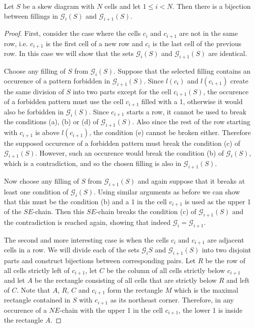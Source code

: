 \begin{lemma}\label{lemma_gi}
Let $S$ be a skew diagram with $N$ cells and let $1 \leq i < N$. Then there is a bijection between fillings in $\mathcal{G}_i(S)$
and $\mathcal{G}_{i+1}(S)$.
\end{lemma}
\begin{proof}
First, consider the case where the cells $c_i$ and $c_{i+1}$ are not in the same row, i.e. $c_{i+1}$ is the first cell of a new row
and $c_i$ is the last cell of the previous row. In this case we will show that the sets $\mathcal{G}_i(S)$ and $\mathcal{G}_{i+1}(S)$
are identical.

Choose any filling of $S$ from $\mathcal{G}_i(S)$. Suppose that the selected filling contains an occurence of 
a pattern forbidden in $\mathcal{G}_{i+1}(S)$. Since $l(c_i)$ and $l(c_{i+1})$ create the same division of $S$ into two parts
except for the cell $c_{i+1}(S)$, the occurence of a forbidden pattern must use the cell $c_{i+1}$ filled with a 1, otherwise it would also be
forbidden in $\mathcal{G}_i(S)$. Since $c_{i+1}$ starts a row, it cannot be used to break the conditions (a), (b) or (d) of $\mathcal{G}_{i+1}(S)$.
Also since the rest of the row starting with $c_{i+1}$ is above $l(c_{i+1})$, the condition (e) cannot be broken either. Therefore the supposed
occurence of a forbidden pattern must break the condition (c) of $\mathcal{G}_{i+1}(S)$. However, such an occurence would break
the condition (b) of $\mathcal{G}_i(S)$, which is a contradiction, and so the chosen filling is also in $\mathcal{G}_{i+1}(S)$.

Now choose any filling of $S$ from $\mathcal{G}_{i+1}(S)$ and again suppose that it breaks at least one condition of $\mathcal{G}_i(S)$.
Using similar arguments as before we can show that this must be the condition (b) and a 1 in the cell $c_{i+1}$ is used as the upper
1 of the $SE$-chain. Then this $SE$-chain breaks the condition (c) of $\mathcal{G}_{i+1}(S)$ and the contradiction is reached again,
showing that indeed $\mathcal{G}_i = \mathcal{G}_{i+1}$.


The second and more interesting case is when the cells $c_i$ and $c_{i+1}$ are adjacent cells in a row. We will divide each of the 
sets $\mathcal{G}_i{S}$ and $\mathcal{G}_{i+1}(S)$ into two disjoint parts and construct bijections between corresponding pairs.
Let $R$ be the row of all cells strictly left of $c_{i+1}$, let $C$ be the column of all cells strictly below $c_{i+1}$
and let $A$ be the rectangle consisting of all cells that are strictly below $R$ and left of $C$. Note that $A$, $R$, $C$ and $c_{i+1}$
form the rectangle $M$ which is the maximal rectangle contained in $S$ with $c_{i+1}$ as its northeast corner. 
Therefore, in any occurence of a $NE$-chain with the upper 1 in the cell $c_{i+1}$, the lower 1 is inside the rectangle $A$.


\end{proof}
